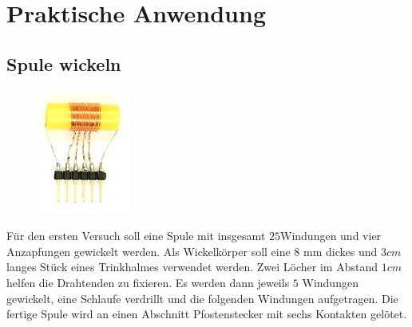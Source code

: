 

\newpage

\section*{Praktische Anwendung}

\subsection*{Spule wickeln}

\begin{figure}
 \vspace{-10pt}
 \centering 
 \includegraphics[scale=4]{Spule/Bilder/Spule_bau.jpg}
 \vspace{-5pt}
\end{figure}

Für den ersten Versuch soll eine Spule mit insgesamt $25 $Windungen und vier Anzapfungen gewickelt werden. Als Wickelkörper soll eine 8 mm dickes und $3cm$ langes Stück eines Trinkhalmes verwendet werden. Zwei Löcher im Abstand $1cm$ helfen die Drahtenden zu fixieren. Es werden dann jeweils $5$ Windungen gewickelt, eine Schlaufe verdrillt und die folgenden Windungen aufgetragen. Die fertige Spule wird an einen Abschnitt Pfostenstecker mit sechs Kontakten gelötet. 

